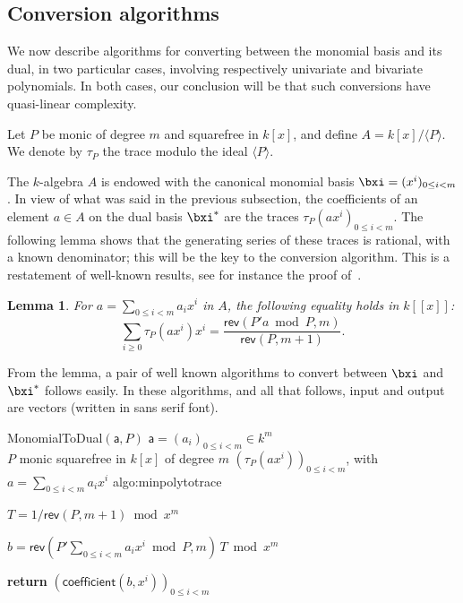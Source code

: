 \documentclass{sig-alternate}
\def\va {\ensuremath{\mathsf{a}}}
\def\coeff {\ensuremath{\mathsf{coefficient}}}
\def\rev {\ensuremath{\mathsf{rev}}}
\newcounter{algo}
\newenvironment{algorithm_noendline}[4]{\small\begin{center}\begin{minipage}{0.48\textwidth}
      \refstepcounter{algo}
      \label{#4}
      \sf
      \rule{\textwidth}{0.2pt}\\
      \makebox[\textwidth][c]{Algorithm~\arabic{algo}:~\textbf{#1}}\\
      \rule[0.5\baselineskip]{\textwidth}{0.2pt}\\

      \vspace{-12pt}

      \parbox{\textwidth}{\textbf{Input} #2}
      \parbox{\textwidth}{\textbf{Output} #3}

\vspace{-7pt}

      \begin{enumerate*}}{\end{enumerate*}
      \vspace{-11pt}
\end{minipage}\end{center}
}
\newcommand{\ang}[1]{\langle#1\rangle}
\newtheorem{Lemma}{Lemma}
\begin{document}

\subsection{Conversion algorithms} \label{ssec:conversions}
\label{sec:trace-formulas}

We now describe algorithms for converting between the monomial basis and its
dual, in two particular cases, involving respectively univariate
and bivariate polynomials. In both cases, our conclusion will be that
such conversions have quasi-linear complexity.

\smallskip{} 
Let $P$ be monic of degree $m$ and squarefree in $k[x]$, and define
$A=k[x]/\ang{P}$. We denote by $\tau_P$ the trace modulo the ideal $\ang{P}$.

The $k$-algebra $A$ is endowed with the canonical monomial basis
$\bxi=(x^i)_{0 \le i < m}$. In view of what was said in the previous
subsection, the coefficients of an element $a \in A$ on the dual basis
$\bxi^\ast$ are the traces $\tau_P(ax^i)_{0 \le i < m}$. The following
lemma shows that the generating series of these traces is rational,
with a known denominator; this will be the key to the conversion
algorithm. This is a restatement of well-known results, see for
instance the proof of~\cite[Theorem~3.1]{rouiller99}.

\begin{Lemma}\label{lemma:trace:1}
  For $a=\sum_{0 \le i < m} a_i x^i$ in $A$, the following equality
  holds in $k[[x]]$:
  $$\sum_{i \ge 0} \tau_P(a x^i) x^i = \frac{\rev( P' a \bmod P,m)}{\rev(P,m+1)}.$$
\end{Lemma}

From the lemma, a pair of well known algorithms to convert between
$\bxi$ and $\bxi^\ast$ follows easily. In these algorithms, and all
that follows, input and output are vectors (written in {\sf sans
  serif} font).

\begin{algorithm_noendline}
{MonomialToDual$(\va,P)$}
{$\va=(a_i)_{0 \le i < m} \in k^m$ \\  $P$ monic squarefree in $k[x]$ of degree $m$}
{$(\tau_P(a x^i))_{0 \le i < m}$, with $a=\sum_{0 \le i < m} a_i x^i$}
{algo:minpolytotrace}
\item $T = 1/\rev(P, m+1) \bmod x^m$
\item $b = \rev(P' \sum_{0 \le i < m} a_i x^i \bmod P, m)\, T \bmod x^m$
\item {\bf return} $(\coeff(b,x^i))_{0 \le i < m}$
\end{algorithm_noendline}
\end{document}
